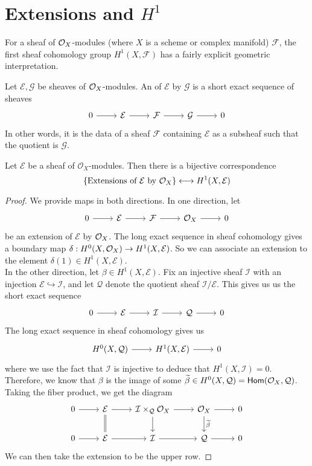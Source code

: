 \section{Extensions and $H^1$}
%
For a sheaf of $\mathcal{O}_X$-modules (where $X$ is a scheme or complex manifold) $\mathcal{F}$,
the first sheaf cohomology group $H^1(X,\mathcal{F})$ has a fairly explicit geometric
interpretation.
%
\begin{defn}
Let $\mathcal{E},\mathcal{G}$ be sheaves of $\mathcal{O}_X$-modules. An  of
$\mathcal{E}$ by $\mathcal{G}$ is a short exact sequence of sheaves
\[\begin{tikzcd}
0 \ar[r] & \mathcal{E} \ar[r] & \mathcal{F} \ar[r] & \mathcal{G} \ar[r] & 0
\end{tikzcd}\]
In other words, it is the data of a sheaf $\mathcal{F}$ containing $\mathcal{E}$
as a subsheaf such that the quotient is $\mathcal{G}$.
\end{defn}
%
\begin{prop}
Let $\mathcal{E}$ be a sheaf of $\mathcal{O}_X$-modules. Then there is a
bijective correspondence
\[
\left\lbrace \text{Extensions of }\mathcal{E} \text{ by } \mathcal{O}_X \right\rbrace
\longleftrightarrow H^1(X,\mathcal{E})
\]
\end{prop}
%
\begin{proof}
We provide maps in both directions. In one direction, let
\[\begin{tikzcd}
0 \ar[r] & \mathcal{E} \ar[r] & \mathcal{F} \ar[r] & \O_X \ar[r] & 0
\end{tikzcd}\]
be an extension of $\mathcal{E}$ by $\mathcal{O}_X$. The long exact sequence in sheaf
cohomology gives a boundary map $\delta : H^0(X,\mathcal{O}_X) \to H^1(X,\mathcal{E})$.
So we can associate an extension to the element $\delta(1) \in H^1(X,\mathcal{E})$. \\

In the other direction, let $\beta \in H^1(X,\mathcal{E})$. Fix an injective sheaf
$\mathcal{I}$ with an injection $\mathcal{E} \hookrightarrow \mathcal{I}$, and
let $\mathcal{Q}$ denote the quotient sheaf $\mathcal{I}/\mathcal{E}$. This gives us
us the short exact sequence
\[\begin{tikzcd}
0 \ar[r] & \mathcal{E} \ar[r] & \mathcal{I} \ar[r] & \mathcal{Q} \ar[r] & 0
\end{tikzcd}\]
The long exact sequence in sheaf cohomology gives us
\[\begin{tikzcd}
H^0(X,\mathcal{Q}) \ar[r] & H^1(X,\mathcal{E}) \ar[r] & 0
\end{tikzcd}\]
where we use the fact that $\mathcal{I}$ is injective to deduce that
$H^1(X,\mathcal{I}) = 0$. Therefore, we know that $\beta$ is the image of
some $\widetilde{\beta} \in H^0(X,\mathcal{Q}) = \mathsf{Hom}(\mathcal{O}_X,\mathcal{Q})$. Taking
the fiber product, we get the diagram
\[\begin{tikzcd}
0 \ar[r] & \mathcal{E} \ar[d, equal] \ar[r] & \mathcal{I} \times_{\mathcal{Q}} \O_X
\ar[r] \ar[d] & \O_X \ar[r]\ar[d,"\widetilde{\beta}"] & 0 \\
0 \ar[r] & \mathcal{E} \ar[r] & \mathcal{I} \ar[r] & \mathcal{Q} \ar[r] & 0
\end{tikzcd}\]
We can then take the extension to be the upper row.
\end{proof}
